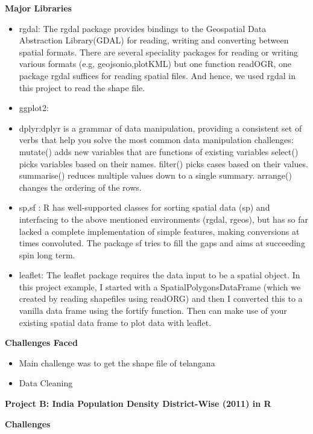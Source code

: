 \documentclass[
]{article}
\providecommand{\tightlist}{%
  \setlength{\itemsep}{0pt}\setlength{\parskip}{0pt}}
\begin{document}
\hypertarget{htmlwidget-dc1f28fc9f8c16ae1a84}{}

\hypertarget{htmlwidget-6a89b700e866d754fd64}{}

\hypertarget{htmlwidget-675141be54ced15706bd}{}

\textbf{Major Libraries}

\begin{itemize}
\item
  rgdal: The rgdal package provides bindings to the Geospatial Data
  Abstraction Library(GDAL) for reading, writing and converting between
  spatial formats. There are several speciality packages for reading or
  writing various formats (e.g, geojsonio,plotKML) but one function
  readOGR, one package rgdal suffices for reading spatial files. And
  hence, we used rgdal in this project to read the shape file.
\item
  ggplot2:
\item
  dplyr:dplyr is a grammar of data manipulation, providing a consistent
  set of verbs that help you solve the most common data manipulation
  challenges: mutate() adds new variables that are functions of existing
  variables select() picks variables based on their names. filter()
  picks cases based on their values. summarise() reduces multiple values
  down to a single summary. arrange() changes the ordering of the rows.
\item
  sp,sf : R has well-supported classes for sorting spatial data (sp) and
  interfacing to the above mentioned environments (rgdal, rgeos), but
  has so far lacked a complete implementation of simple features, making
  conversions at times convoluted. The package sf tries to fill the gaps
  and aims at succeeding spin long term.
\item
  leaflet: The leaflet package requires the data input to be a spatial
  object. In this project example, I started with a
  SpatialPolygonsDataFrame (which we created by reading shapefiles using
  readORG) and then I converted this to a vanilla data frame using the
  fortify function. Then can make use of your existing spatial data
  frame to plot data with leaflet.
\end{itemize}

\textbf{Challenges Faced}

\begin{itemize}
\tightlist
\item
  Main challenge was to get the shape file of telangana
\item
  Data Cleaning
\end{itemize}

\textbf{Project B: India Population Density District-Wise (2011) in R}

\textbf{Challenges}
\end{document}
